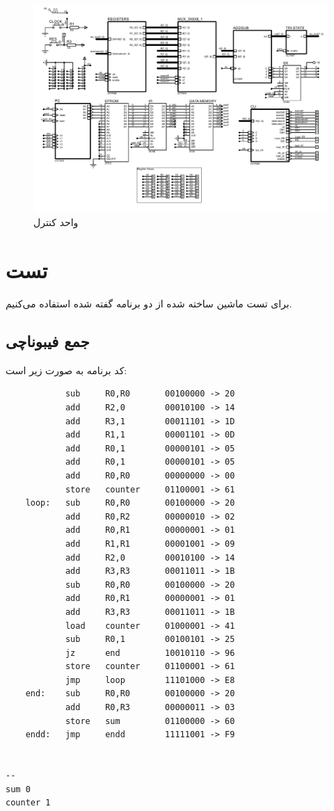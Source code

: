 \documentclass{article}
\begin{document}
\begin{figure}
	\centering
	\includegraphics[scale=0.5,page=7]{./graphics/graphics}
	\caption{واحد کنترل}
	\label{fig:CU}
\end{figure}

\section{تست}
برای تست ماشین ساخته شده از دو برنامه گفته شده استفاده می‌کنیم.

\subsection{جمع فیبوناچی}
کد برنامه به صورت زیر است:
\begin{latin}
\begin{lstlisting}
			sub 	R0,R0		00100000 -> 20
			add		R2,0		00010100 -> 14
			add 	R3,1		00011101 -> 1D
			add		R1,1		00001101 -> 0D
			add		R0,1		00000101 -> 05
			add		R0,1		00000101 -> 05
			add		R0,R0		00000000 -> 00
			store	counter		01100001 -> 61
	loop:	sub		R0,R0		00100000 -> 20
			add		R0,R2		00000010 -> 02
			add		R0,R1		00000001 -> 01
			add		R1,R1		00001001 -> 09
			add		R2,0		00010100 -> 14
			add		R3,R3		00011011 -> 1B
			sub		R0,R0		00100000 -> 20
			add 	R0,R1		00000001 -> 01
			add		R3,R3		00011011 -> 1B
			load	counter		01000001 -> 41
			sub		R0,1		00100101 -> 25
			jz		end			10010110 -> 96
			store	counter		01100001 -> 61
			jmp		loop		11101000 -> E8
	end:	sub		R0,R0		00100000 -> 20
			add		R0,R3		00000011 -> 03
			store	sum			01100000 -> 60
	endd:	jmp		endd		11111001 -> F9
	
	
--
sum 0
counter 1
\end{lstlisting}
\end{latin}
\end{document}
